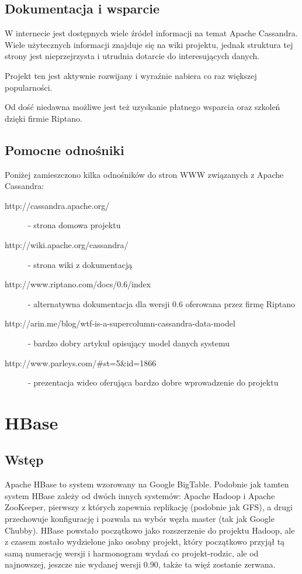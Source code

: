 \subsection*{Dokumentacja i wsparcie}

W internecie jest dostępnych wiele źródeł informacji na temat Apache Cassandra.
Wiele użytecznych informacji znajduje się na wiki projektu, jednak struktura tej strony jest nieprzejrzysta i utrudnia dotarcie do interesujących danych.

Projekt ten jest aktywnie rozwijany i wyraźnie nabiera co raz większej popularności.

Od dość niedawna możliwe jest też uzyskanie płatnego wsparcia oraz szkoleń dzięki firmie Riptano.

\subsection*{Pomocne odnośniki}

Poniżej zamieszczono kilka odnośników do stron WWW związanych z Apache Cassandra:

\begin{description}
 \item [http://cassandra.apache.org/] - strona domowa projektu
 \item [http://wiki.apache.org/cassandra/] - strona wiki z dokumentacją
 \item [http://www.riptano.com/docs/0.6/index] - alternatywna dokumentacja dla wersji 0.6 oferowana przez firmę Riptano
 \item [http://arin.me/blog/wtf-is-a-supercolumn-cassandra-data-model] - bardzo dobry artykuł opisujący model danych systemu
 \item [http://www.parleys.com/\#st=5\&id=1866] - prezentacja wideo oferująca bardzo dobre wprowadzenie do projektu
\end{description}

\section{HBase}
\label{sec:hbase}

\subsection*{Wstęp}

Apache HBase to system wzorowany na Google BigTable.
Podobnie jak tamten system HBase zależy od dwóch innych systemów: Apache Hadoop i Apache ZooKeeper, pierwszy z których zapewnia replikację (podobnie jak GFS), a drugi przechowuje konfigurację i pozwala na wybór węzła master (tak jak Google Chubby).
HBase powstało początkowo jako rozszerzenie do projektu Hadoop, ale z czasem zostało wydzielone jako osobny projekt, który początkowo przyjął tą samą numerację wersji i harmonogram wydań co projekt-rodzic, ale od najnowszej, jeszcze nie wydanej wersji 0.90, także ta więź zostanie zerwana.

